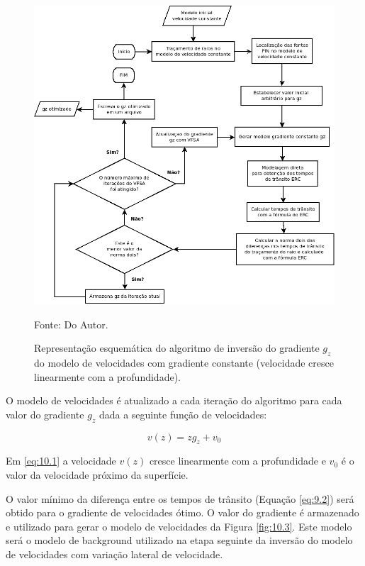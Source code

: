 \begin{figure}[H]
\caption{Representação esquemática do algoritmo de inversão do gradiente $g_z$ do modelo de velocidades
com gradiente constante (velocidade cresce linearmente com a profundidade).}
\begin{center}
\includegraphics[scale=0.5]{images/fluxogz.png}
\vspace{-0.3cm}
\end{center}
\begin{center}
 Fonte: Do Autor.
\end{center}
\label{fig:10.2}
\end{figure}

O modelo de velocidades é atualizado a cada iteração do algoritmo para cada valor do gradiente $g_z$
dada a seguinte função de velocidades:

\begin{equation}
\label{eq:10.1}
v(z)=z g_z+v_0
\end{equation}

Em \ref{eq:10.1} a velocidade $v(z)$ cresce linearmente com a profundidade e $v_0$
é o valor da velocidade próximo da superfície.

O valor mínimo da diferença entre os tempos de trânsito (Equação \ref{eq:9.2})
será obtido para o gradiente de velocidades ótimo.
O valor do gradiente é armazenado e utilizado para gerar o modelo de velocidades
da Figura \ref{fig:10.3}. Este modelo será o modelo de background utilizado na etapa seguinte
da inversão do modelo de velocidades com variação lateral de velocidade.

